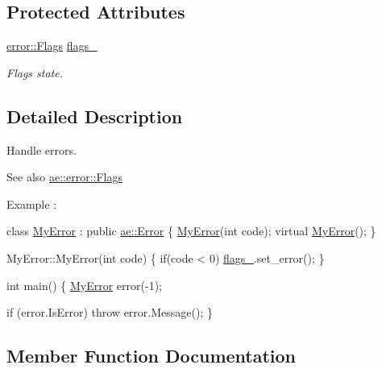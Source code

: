 \subsection*{Protected Attributes}
\begin{DoxyCompactItemize}
\item 
\hyperlink{structae_1_1error_1_1_flags}{error\+::\+Flags} \hyperlink{classae_1_1_error_a323912fc2d0f697f2513d0c990478073}{flags\+\_\+}
\begin{DoxyCompactList}\small\item\em Flags state. \end{DoxyCompactList}\end{DoxyCompactItemize}


\subsection{Detailed Description}
Handle errors. 

\begin{DoxySeeAlso}{See also}
\hyperlink{structae_1_1error_1_1_flags}{ae\+::error\+::\+Flags}
\end{DoxySeeAlso}
Example \+: 
\begin{DoxyCode}
\textcolor{keyword}{class }\hyperlink{class_my_error}{MyError} : \textcolor{keyword}{public} \hyperlink{classae_1_1_error}{ae::Error} \{
    \hyperlink{class_my_error}{MyError}(\textcolor{keywordtype}{int} code);
    \textcolor{keyword}{virtual} \hyperlink{class_my_error}{MyError}();
\}

MyError::MyError(\textcolor{keywordtype}{int} code) \{
    \textcolor{keywordflow}{if}(code < 0)
        \hyperlink{classae_1_1_error_a323912fc2d0f697f2513d0c990478073}{flags\_}.set\_error();
\}

\textcolor{keywordtype}{int} main() \{
    \hyperlink{class_my_error}{MyError} error(-1);

    \textcolor{keywordflow}{if} (error.IsError) \textcolor{keywordflow}{throw} error.Message();
\}
\end{DoxyCode}
 

\subsection{Member Function Documentation}
\hypertarget{classae_1_1_error_ab6172fe7f6627dd726223bd4bd923693}{}\label{classae_1_1_error_ab6172fe7f6627dd726223bd4bd923693} 
